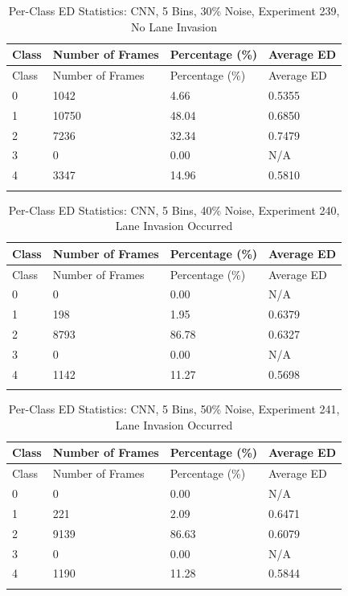 
\begin{longtable}{@{}llll@{}}
\toprule
Class & Number of Frames & Percentage (\%) & Average ED \\
\midrule
\endfirsthead
\toprule
Class & Number of Frames & Percentage (\%) & Average ED \\
\midrule
\endhead
0 & 1042 & 4.66 & 0.5355 \\
1 & 10750 & 48.04 & 0.6850 \\
2 & 7236 & 32.34 & 0.7479 \\
3 & 0 & 0.00 & N/A \\
4 & 3347 & 14.96 & 0.5810 \\
\bottomrule
\caption{Per-Class ED Statistics: CNN, 5 Bins, 30\% Noise, Experiment 239, No Lane Invasion}
\label{tab:exp239_CNN_5bins_30noise}
\end{longtable}
        


\begin{longtable}{@{}llll@{}}
\toprule
Class & Number of Frames & Percentage (\%) & Average ED \\
\midrule
\endfirsthead
\toprule
Class & Number of Frames & Percentage (\%) & Average ED \\
\midrule
\endhead
0 & 0 & 0.00 & N/A \\
1 & 198 & 1.95 & 0.6379 \\
2 & 8793 & 86.78 & 0.6327 \\
3 & 0 & 0.00 & N/A \\
4 & 1142 & 11.27 & 0.5698 \\
\bottomrule
\caption{Per-Class ED Statistics: CNN, 5 Bins, 40\% Noise, Experiment 240, Lane Invasion Occurred}
\label{tab:exp240_CNN_5bins_40noise}
\end{longtable}
        


\begin{longtable}{@{}llll@{}}
\toprule
Class & Number of Frames & Percentage (\%) & Average ED \\
\midrule
\endfirsthead
\toprule
Class & Number of Frames & Percentage (\%) & Average ED \\
\midrule
\endhead
0 & 0 & 0.00 & N/A \\
1 & 221 & 2.09 & 0.6471 \\
2 & 9139 & 86.63 & 0.6079 \\
3 & 0 & 0.00 & N/A \\
4 & 1190 & 11.28 & 0.5844 \\
\bottomrule
\caption{Per-Class ED Statistics: CNN, 5 Bins, 50\% Noise, Experiment 241, Lane Invasion Occurred}
\label{tab:exp241_CNN_5bins_50noise}
\end{longtable}
        

